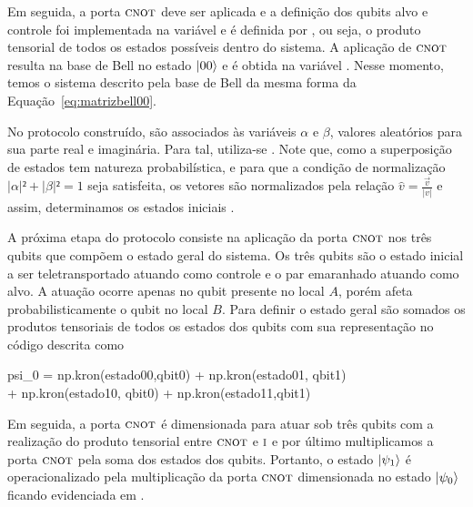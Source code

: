 Em seguida, a porta \(\operatorname{\textsc{cnot}}\) deve ser aplicada e a definição dos qubits alvo e controle foi implementada na variável  e é definida por , ou seja, o produto tensorial de todos os estados possíveis dentro do sistema. A aplicação de \(\operatorname{\textsc{cnot}}\) resulta na base de Bell no estado $\ket{00}$ e é obtida na variável . Nesse momento, temos o sistema descrito pela base de Bell da mesma forma da Equação~\eqref{eq:matrizbell00}.

No protocolo construído, são associados às variáveis $\alpha$ e $\beta$, valores aleatórios para sua parte real e imaginária. Para tal, utiliza-se . Note que, como a superposição de estados tem natureza probabilística, e para que a condição de normalização $|\alpha|² + |\beta|² = 1$ seja satisfeita, os vetores são normalizados pela relação $\widehat{v}= \frac{\vec{v}}{|v|}$ e assim, determinamos os estados iniciais .

A próxima etapa do protocolo consiste na aplicação da porta \(\operatorname{\textsc{cnot}}\) nos três qubits que compõem o estado geral do sistema. Os três qubits são o estado inicial a ser teletransportado atuando como controle e o par emaranhado atuando como alvo. A atuação ocorre apenas no qubit presente no local \(A\), porém afeta probabilisticamente o qubit no local \(B\). Para definir o estado geral são somados os produtos tensoriais de todos os estados dos qubits com sua representação no código descrita como
\begin{pycode}
  psi_0 = np.kron(estado00,qbit0) + np.kron(estado01, qbit1)\\
   + np.kron(estado10, qbit0) + np.kron(estado11,qbit1)
\end{pycode}
Em seguida, a porta \(\operatorname{\textsc{cnot}}\) é dimensionada para atuar sob três qubits com a realização do produto tensorial entre \(\operatorname{\textsc{cnot}}\) e \(\operatorname{\textsc{i}}\) e por último multiplicamos a porta \(\operatorname{\textsc{cnot}}\) pela soma dos estados dos qubits. Portanto, o estado $\ket{\psi_1}$ é operacionalizado pela multiplicação da porta \(\operatorname{\textsc{cnot}}\) dimensionada no estado $\ket{\psi_0}$ ficando evidenciada em .

